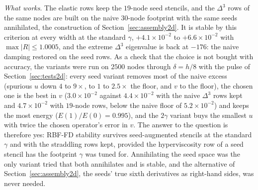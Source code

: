 \documentclass[11pt]{amsart}
\theoremstyle{definition}
\theoremstyle{remark}
\newcommand{\para}[1]{\par\smallskip\noindent\textit{#1}.\enspace}
\newcommand{\sci}[2]{\ensuremath{#1 \times 10^{#2}}}
\newcommand{\tablesetup}{\footnotesize\setlength{\tabcolsep}{2.5pt}%
  \renewcommand{\sci}[2]{\ensuremath{##1{\times}10^{##2}}}}
\begin{document}
\para{What works}
The elastic rows keep the $19$-node seed stencils, and the $\Delta^3$
rows of the same nodes are built on the naive $30$-node footprint with
the same seeds annihilated, the construction of
Section~\ref{sec:assembly2d}. It is stable by this criterion at every width at the
standard $\gamma$, $+4.1 \times 10^{-2}$ to $+6.6 \times 10^{-2}$ with
$\max |R| \le 1.0005$, and the extreme $\Delta^3$ eigenvalue is back at
$-176$: the naive damping restored on the seed rows. As a check that
the choice is not bought with accuracy, the variants were run on
$2500$ nodes through $\delta = h / 8$ with the pulse of
Section~\ref{sec:tests2d}: every seed variant removes most of the naive
excess (spurious $u$ down $4$ to $9\times$, to $1$ to $2.5\times$ the
floor, and $v$ to the floor), the chosen one is the best in $v$
($3.0 \times 10^{-2}$ against $4.4 \times 10^{-2}$ with the naive
$\Delta^3$ rows kept and $4.7 \times 10^{-2}$ with $19$-node rows, below
the naive floor of $5.2 \times 10^{-2}$) and keeps the most energy
($E(1) / E(0) = 0.995$), and the $2\gamma$ variant buys the smallest $u$
with twice the chosen operator's error in $v$. The answer to the
question is therefore yes: RBF-FD stability survives seed-augmented
stencils at the standard $\gamma$ and with the straddling rows kept,
provided the hyperviscosity row of a seed stencil has the footprint
$\gamma$ was tuned for. Annihilating the seed space was the only variant
tried that both annihilates and is stable, and the alternative of
Section~\ref{sec:assembly2d}, the seeds' true sixth derivatives as
right-hand sides, was never needed.

\begin{table}
  \caption{The operators tried on the $900$-node flat set, at the
  standard $\gamma$ and CFL $0.5$: rebuilt rows, the largest real part
  of the spectrum with the hyperviscosity in, and the largest RK4
  amplification over it. ``Seeds'' is the operator of
  Section~\ref{sec:assembly2d}; the four variants below it at each width
  are the rejected constructions of the text; the last row at each width
  is the control with plain $19$-node degree-three stencils everywhere
  and no seeds.}
  \label{tab:variants900}
  \centering
  \tablesetup
  
\end{table}
\end{document}
